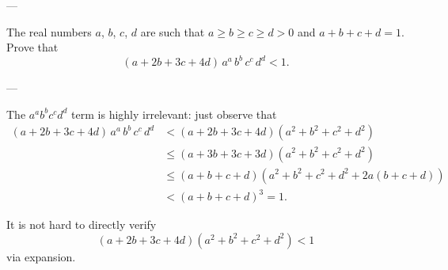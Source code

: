 
---

The real numbers $a$, $b$, $c$, $d$ are such that $a\ge b\ge c\ge d>0$ and $a+b+c+d=1$. Prove that
\[(a+2b+3c+4d)\,a^a\,b^b\,c^c\,d^d<1.\]

---

The $a^ab^bc^cd^d$ term is highly irrelevant: just observe that
\begin{align*}
    (a+2b+3c+4d)\,a^a\,b^b\,c^c\,d^d&<(a+2b+3c+4d)\left(a^2+b^2+c^2+d^2\right)\\
    &\le(a+3b+3c+3d)\left(a^2+b^2+c^2+d^2\right)\\
    &\le(a+b+c+d)\left(a^2+b^2+c^2+d^2+2a(b+c+d)\right)\\
    &<(a+b+c+d)^3=1.
\end{align*}
\begin{remark}
    It is not hard to directly verify
    \[(a+2b+3c+4d)\left(a^2+b^2+c^2+d^2\right)<1\]
    via expansion.
\end{remark}

